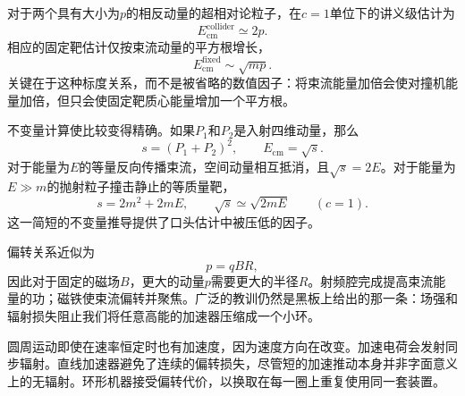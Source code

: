 对于两个具有大小为\(p\)的相反动量的超相对论粒子，在\(c=1\)单位下的讲义级估计为
\begin{equation}
E_{\mathrm{cm}}^{\mathrm{collider}}\simeq 2p.
\end{equation}
相应的固定靶估计仅按束流动量的平方根增长，
\begin{equation}
E_{\mathrm{cm}}^{\mathrm{fixed}}\sim \sqrt{mp}.
\end{equation}
关键在于这种标度关系，而不是被省略的数值因子：将束流能量加倍会使对撞机能量加倍，但只会使固定靶质心能量增加一个平方根。

不变量计算使比较变得精确。如果\(P_1\)和\(P_2\)是入射四维动量，那么
\begin{equation}
s=(P_1+P_2)^2,
\qquad E_{\mathrm{cm}}=\sqrt{s}.
\end{equation}
对于能量为\(E\)的等量反向传播束流，空间动量相互抵消，且\(\sqrt{s}=2E\)。对于能量为\(E\gg m\)的抛射粒子撞击静止的等质量靶，
\begin{equation}
s=2m^2+2mE,
\qquad
\sqrt{s}\simeq \sqrt{2mE}
\qquad (c=1).
\end{equation}
这一简短的不变量推导提供了口头估计中被压低的因子。

\begin{classroomqa}
\end{classroomqa}

偏转关系近似为
\begin{equation}
p=qBR,
\end{equation}
因此对于固定的磁场\(B\)，更大的动量\(p\)需要更大的半径\(R\)。射频腔完成提高束流能量的功；磁铁使束流偏转并聚焦。广泛的教训仍然是黑板上给出的那一条：场强和辐射损失阻止我们将任意高能的加速器压缩成一个小环。

圆周运动即使在速率恒定时也有加速度，因为速度方向在改变。加速电荷会发射同步辐射。直线加速器避免了连续的偏转损失，尽管短的加速推动本身并非字面意义上的无辐射。环形机器接受偏转代价，以换取在每一圈上重复使用同一套装置。

\begin{classroomqa}
\end{classroomqa}

